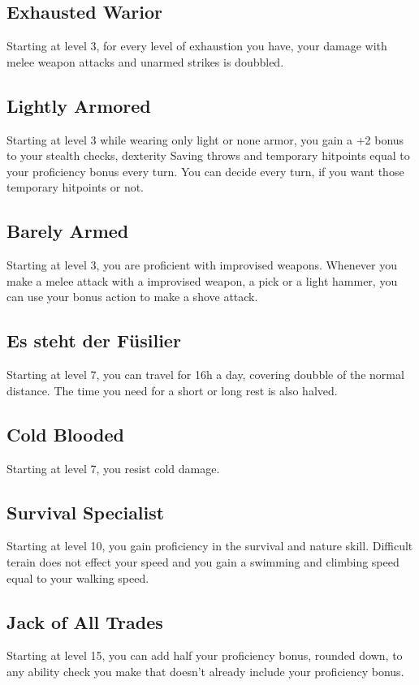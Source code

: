\documentclass[a4paper,10pt,twoside,twocolumn, bg=full]{dndbook} %
\begin{document}
		\subsection{Exhausted Warior}
			Starting at level 3, for every level of exhaustion you have, your damage with melee weapon attacks and unarmed strikes is doubbled.
		\subsection{Lightly Armored}
			Starting at level 3 while wearing only light or none armor, you gain a +2 bonus to your stealth checks, dexterity Saving throws and temporary hitpoints equal to your proficiency bonus every turn. You can decide every turn, if you want those temporary hitpoints or not.
		\subsection{Barely Armed}
			Starting at level 3, you are proficient with improvised weapons. Whenever you make a melee attack with a improvised weapon, a pick or a light hammer, you can use your bonus action to make a shove attack.
		\subsection{Es steht der Füsilier}
			Starting at level 7, you can travel for 16h a day, covering doubble of the normal distance. The time you need for a short or long rest is also halved.
		\subsection{Cold Blooded}
			Starting at level 7, you resist cold damage.
		\subsection{Survival Specialist}
			Starting at level 10, you gain proficiency in the survival and nature skill. Difficult terain does not effect your speed and you gain a swimming and climbing speed equal to your walking speed.
			\subsection{Jack of All Trades}
				Starting at level 15, you can add half your proficiency bonus, rounded down, to any ability check you make that doesn't already include your proficiency bonus.
\end{document}
